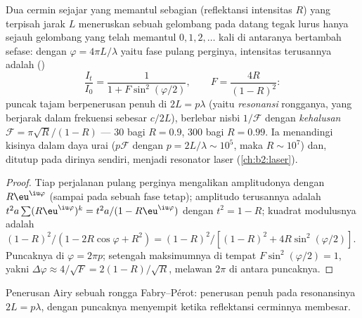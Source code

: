 \begin{proposition}\label{prop:b2:gratings:fabryperot}
Dua cermin sejajar yang memantul sebagian (reflektansi intensitas $R$)
yang terpisah jarak $L$ meneruskan sebuah gelombang pada datang tegak lurus hanya sejauh
gelombang yang telah memantul $0, 1, 2, \dots$ kali di antaranya bertambah
sefase: dengan $\varphi = 4\pi L/\lambda$ yaitu fase pulang perginya, intensitas
terusannya adalah ()
\[
\frac{I_t}{I_0} = \frac1{1 + F\sin^2(\varphi/2)} , \qquad F = \frac{4R}{(1 - R)^2} :
\]
puncak tajam berpenerusan penuh di $2L = p\lambda$ (yaitu \emph{resonansi}
rongganya, yang berjarak dalam frekuensi sebesar \emph{}
$c/2L$), berlebar nisbi $1/\mathcal F$ dengan \emph{kehalusan} $\mathcal F = \pi
\sqrt R/(1 - R)$ --- $30$ bagi $R = 0.9$, $300$ bagi $R = 0.99$. Ia menandingi kisinya
dalam daya urai ($p\mathcal F$ dengan $p = 2L/\lambda \sim 10^5$, maka $R \sim
10^7$) dan, ditutup pada dirinya sendiri, menjadi resonator laser
(\cref{ch:b2:laser}).
\end{proposition}

\begin{proof}
Tiap perjalanan pulang perginya mengalikan amplitudonya dengan $R\eu^{\iu\varphi}$ (sampai pada sebuah
fase tetap); amplitudo terusannya adalah $t^2a\sum(R\eu^{\iu\varphi})^k =
t^2a/(1 - R\eu^{\iu\varphi})$ dengan $t^2 = 1 - R$; kuadrat modulusnya adalah $(1 - R)^2/
(1 - 2R\cos\varphi + R^2) = (1 - R)^2/[(1 - R)^2 + 4R\sin^2(\varphi/2)]$. Puncaknya di
$\varphi = 2\pi p$; setengah maksimumnya di tempat $F\sin^2(\varphi/2) = 1$, yakni $\Delta\varphi \approx
4/\sqrt F = 2(1 - R)/\sqrt R$, melawan $2\pi$ di antara puncaknya.
\end{proof}

\begin{omfigure}

{\small Penerusan Airy sebuah rongga Fabry--Pérot: penerusan
penuh pada resonansinya $2L = p\lambda$, dengan puncaknya menyempit ketika
reflektansi cerminnya membesar.}
\end{omfigure}

